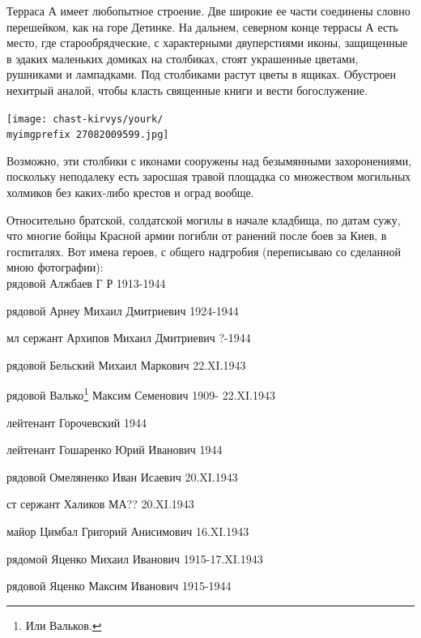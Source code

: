 Терраса А имеет любопытное строение. Две широкие ее части соединены словно перешейком, как на горе Детинке. На дальнем, северном конце террасы А есть место, где старообрядческие, с характерными двуперстиями иконы, защищенные в эдаких маленьких домиках на столбиках, стоят украшенные цветами, рушниками и лампадками. Под столбиками растут цветы в ящиках. Обустроен нехитрый аналой, чтобы класть священные книги и вести богослужение.

\begin{center}
\texttt{[image: chast-kirvys/yourk/\\myimgprefix 27082009599.jpg]}
\end{center} 



Возможно, эти столбики с иконами сооружены над безымянными захоронениями, поскольку неподалеку есть заросшая травой площадка со множеством могильных холмиков без каких-либо крестов и оград вообще.

Относительно братской, солдатской могилы в начале кладбища, по датам сужу, что многие бойцы Красной армии погибли от ранений после боев за Киев, в госпиталях. Вот имена героев, с общего надгробия (переписываю со сделанной мною фотографии):\\

\noindent
рядовой Алжбаев Г Р 1913-1944

\noindent
рядовой Арнеу Михаил Дмитриевич 1924-1944

\noindent
мл сержант Архипов Михаил Дмитриевич ?-1944

\noindent
рядовой Бельский Михаил Маркович 22.XI.1943

\noindent
рядовой Валько\footnote{Или Вальков.} Максим Семенович 1909- 22.XI.1943

\noindent
лейтенант Горочевский 1944

\noindent
лейтенант Гошаренко Юрий Иванович 1944

\noindent
рядовой Омеляненко Иван Исаевич 20.XI.1943

\noindent
ст сержант Халиков МА?? 20.XI.1943

\noindent
майор Цимбал Григорий Анисимович 16.XI.1943

\noindent
рядомой Яценко Михаил Иванович 1915-17.XI.1943

\noindent
рядовой Яценко Максим Иванович 1915-1944\\

